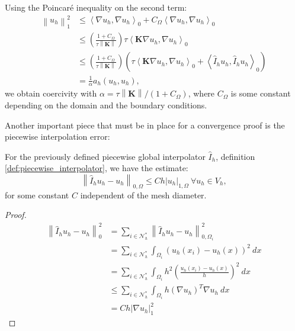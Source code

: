 \documentclass[../Main/main.tex]{subfiles}
\begin{document}
		Using the Poincaré inequality on the second term:
		\begin{equation}
		\begin{aligned} 
		\left \| u_h \right \|_1^2	&\leq \left \langle \nabla u_h,\nabla u_h \right \rangle_0 + C_{\Omega} \left \langle \nabla u_h, \nabla u_h \right \rangle_0 \\
			&\leq \left(\frac{1+C_{\Omega}}{\tau \left \|\bm{K}\right \|} \right) \tau \left  \langle  \bm{K} \nabla  u_h, \nabla u_h \right \rangle_0  \\
			&\leq \left(\frac{1+C_{\Omega}}{\tau \left \|\bm{K}\right \|} \right) \left(\tau \left  \langle  \bm{K} \nabla  u_h, \nabla u_h \right \rangle_0 + \left \langle \hat{I}_h u_h,\hat{I}_h u_h \right \rangle_0\right)\\
			&= \frac{1}{\alpha} a_h(u_h,u_h), 
		\end{aligned}
	\end{equation} 
	we obtain coercivity with $\alpha = \tau \left \|\bm{K}\right \|/(1+C_{\Omega})$, where $C_{\Omega}$ is some constant depending on the domain and the boundary conditions.\par
	Another important piece that must be in place for a convergence proof is the piecewise interpolation error:
	\begin{lemma}\label{lemma:int_error}
		For the previously defined piecewise global interpolator $\hat{I}_h$, definition \ref{def:piecewise_interpolator}, we have the estimate:
		\begin{equation}
			\left \| \hat{I}_h u_h - u_h \right \|_{0,\Omega} \leq C h | u_h |_{1,\Omega} \ \forall u_h \in V_h,
		\end{equation}
		for some constant $C$ independent of the mesh diameter.
	\end{lemma}
	\begin{proof}
		\begin{equation}
			\begin{aligned}
				\left \| \hat{I}_h u_h - u_h \right \|^2_0 &= \sum_{i\in \mathcal{N}_h^*} \left \|\hat{I}_h u_h - u_h\right \|^2_{0,\Omega_i} \\
					&=\sum_{i\in \mathcal{N}_h^*} \int_{\Omega_i}\left(u_h(x_i)-u_h(x)  \right)^2 \ dx\\
					&=\sum_{i\in \mathcal{N}_h^*} \int_{\Omega_i}h^2\left(\frac{u_h(x_i)-u_h(x)}{h}  \right)^2 \ dx\\
					&\leq \sum_{i\in \mathcal{N}_h^*} \int_{\Omega_i} h (\nabla u_h)^T \nabla u_h \ dx\\
					&=Ch|\nabla u_h|_1^2
			\end{aligned}
		\end{equation}
	\end{proof}
\end{document}
